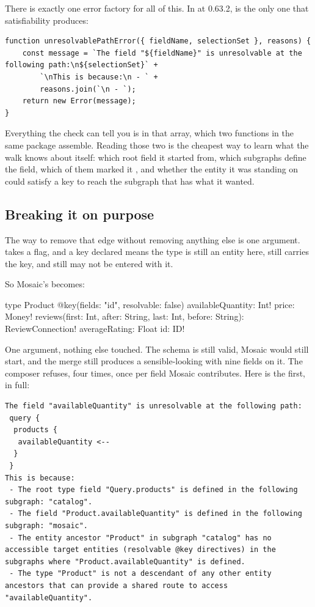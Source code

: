 %
There is exactly one error factory for all of this. In
 at 0.63.2,  is the
only one that satisfiability produces:

\begin{verbatim}
function unresolvablePathError({ fieldName, selectionSet }, reasons) {
    const message = `The field "${fieldName}" is unresolvable at the following path:\n${selectionSet}` +
        `\nThis is because:\n - ` +
        reasons.join(`\n - `);
    return new Error(message);
}
\end{verbatim}

Everything the check can tell you is in that  array, which two
functions in the same package assemble. Reading those two is the cheapest way to
learn what the walk knows about itself: which root field it started from, which
subgraphs define the field, which of them marked it , and
whether the entity it was standing on could satisfy a key to reach the subgraph
that has what it wanted.

\subsection*{Breaking it on purpose}

%
The way to remove that edge without removing anything else is one argument.
 takes a  flag, and a key declared
 means the type is still an entity here, still carries
the key, and still may not be entered with it.

So Mosaic's  becomes:

\begin{graphqlsdl}
type Product @key(fields: "id", resolvable: false) {
  availableQuantity: Int!
  price: Money!
  reviews(first: Int, after: String, last: Int, before: String): ReviewConnection!
  averageRating: Float
  id: ID!
}
\end{graphqlsdl}

One argument, nothing else touched. The schema is still valid, Mosaic would
still start, and the merge still produces a sensible-looking  with
nine fields on it. The composer refuses, four times, once per field Mosaic
contributes. Here is the first, in full:

\begin{verbatim}
The field "availableQuantity" is unresolvable at the following path:
 query {
  products {
   availableQuantity <--
  }
 }
This is because:
 - The root type field "Query.products" is defined in the following subgraph: "catalog".
 - The field "Product.availableQuantity" is defined in the following subgraph: "mosaic".
 - The entity ancestor "Product" in subgraph "catalog" has no accessible target entities (resolvable @key directives) in the subgraphs where "Product.availableQuantity" is defined.
 - The type "Product" is not a descendant of any other entity ancestors that can provide a shared route to access "availableQuantity".
\end{verbatim}

